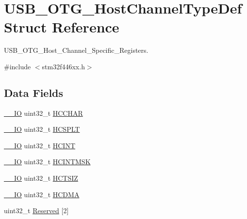 \hypertarget{struct_u_s_b___o_t_g___host_channel_type_def}{}\section{U\+S\+B\+\_\+\+O\+T\+G\+\_\+\+Host\+Channel\+Type\+Def Struct Reference}
\label{struct_u_s_b___o_t_g___host_channel_type_def}


U\+S\+B\+\_\+\+O\+T\+G\+\_\+\+Host\+\_\+\+Channel\+\_\+\+Specific\+\_\+\+Registers.  




{\ttfamily \#include $<$stm32f446xx.\+h$>$}

\subsection*{Data Fields}
\begin{DoxyCompactItemize}
\item 
\mbox{\hyperlink{core__sc300_8h_aec43007d9998a0a0e01faede4133d6be}{\+\_\+\+\_\+\+IO}} uint32\+\_\+t \mbox{\hyperlink{struct_u_s_b___o_t_g___host_channel_type_def_ac1d0619a44758dcaeeda5c0b9c22f784}{H\+C\+C\+H\+AR}}
\item 
\mbox{\hyperlink{core__sc300_8h_aec43007d9998a0a0e01faede4133d6be}{\+\_\+\+\_\+\+IO}} uint32\+\_\+t \mbox{\hyperlink{struct_u_s_b___o_t_g___host_channel_type_def_ad715951248900b9a7c8c9ddb688bb3a0}{H\+C\+S\+P\+LT}}
\item 
\mbox{\hyperlink{core__sc300_8h_aec43007d9998a0a0e01faede4133d6be}{\+\_\+\+\_\+\+IO}} uint32\+\_\+t \mbox{\hyperlink{struct_u_s_b___o_t_g___host_channel_type_def_a830a2b58d0eb53a7ec8f9816103e3bc1}{H\+C\+I\+NT}}
\item 
\mbox{\hyperlink{core__sc300_8h_aec43007d9998a0a0e01faede4133d6be}{\+\_\+\+\_\+\+IO}} uint32\+\_\+t \mbox{\hyperlink{struct_u_s_b___o_t_g___host_channel_type_def_ae69520f078c84fb1d33cd7551ff23342}{H\+C\+I\+N\+T\+M\+SK}}
\item 
\mbox{\hyperlink{core__sc300_8h_aec43007d9998a0a0e01faede4133d6be}{\+\_\+\+\_\+\+IO}} uint32\+\_\+t \mbox{\hyperlink{struct_u_s_b___o_t_g___host_channel_type_def_adde42c516172a887c570545d965200cf}{H\+C\+T\+S\+IZ}}
\item 
\mbox{\hyperlink{core__sc300_8h_aec43007d9998a0a0e01faede4133d6be}{\+\_\+\+\_\+\+IO}} uint32\+\_\+t \mbox{\hyperlink{struct_u_s_b___o_t_g___host_channel_type_def_af294702e1d54fe06b43e7a3b4033dc2e}{H\+C\+D\+MA}}
\item 
uint32\+\_\+t \mbox{\hyperlink{struct_u_s_b___o_t_g___host_channel_type_def_ae930d94b6a3272fed7c42c1a02929924}{Reserved}} \mbox{[}2\mbox{]}
\end{DoxyCompactItemize}



